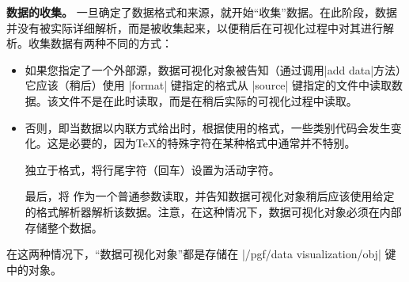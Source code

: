 \begin{command}{\pgfdata{}}
    \textbf{数据的收集。} 一旦确定了数据格式和来源，就开始``收集''数据。在此阶段，数据并没有被实际详细解析，而是被收集起来，以便稍后在可视化过程中对其进行解析。收集数据有两种不同的方式：
    \begin{itemize}
        \item 如果您指定了一个外部源，数据可视化对象被告知（通过调用|add data|方法）它应该（稍后）使用 |format| 键指定的格式从 |source| 键指定的文件中读取数据。该文件不是在此时读取，而是在稍后实际的可视化过程中读取。
        \item 否则，即当数据以内联方式给出时，根据使用的格式，一些类别代码会发生变化。这是必要的，因为\TeX 的特殊字符在某种格式中通常并不特别。


            独立于格式，将行尾字符（回车）设置为活动字符。


            最后，将  作为一个普通参数读取，并告知数据可视化对象稍后应该使用给定的格式解析器解析该数据。注意，在这种情况下，数据可视化对象必须在内部存储整个数据。
    \end{itemize}
    在这两种情况下，``数据可视化对象''都是存储在 |/pgf/data visualization/obj| 键中的对象。


    \medskip


\end{command}
